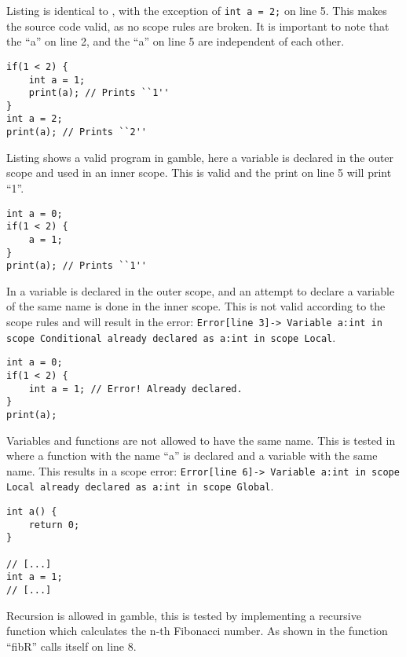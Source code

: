 Listing  is identical to , with the exception of \texttt{int a = 2;} on line 5.
This makes the source code valid, as no scope rules are broken.
It is important to note that the ``a'' on line 2, and the ``a'' on line 5 are independent of each other.

\begin{lstlisting}[caption={Example of a valid program in \gls{gamble}},label={lst:scope2},frame=tb]
if(1 < 2) {
    int a = 1;
    print(a); // Prints ``1''
}
int a = 2;
print(a); // Prints ``2''
\end{lstlisting}

Listing  shows a valid program in \gls{gamble}, here a variable is declared in the outer scope and used in an inner scope.
This is valid and the print on line 5 will print ``1''.

\begin{lstlisting}[caption={Example of a valid program in \gls{gamble}},label={lst:scope3},frame=tb]
int a = 0;
if(1 < 2) {
    a = 1;
}
print(a); // Prints ``1''
\end{lstlisting}

In  a variable is declared in the outer scope, and an attempt to declare a variable of the same name is done in the inner scope.
This is not valid according to the scope rules and will result in the error: \texttt{Error[line    3]-> Variable a:int in scope Conditional already declared as a:int in scope Local}.

\begin{lstlisting}[caption={Example of a redeclaration error in \gls{gamble}},label={lst:scope4},frame=tb]
int a = 0;
if(1 < 2) {
    int a = 1; // Error! Already declared.
}
print(a);
\end{lstlisting}

Variables and functions are not allowed to have the same name.
This is tested in  where a function with the name ``a'' is declared and a variable with the same name.
This results in a scope error: \texttt{Error[line    6]-> Variable a:int in scope Local already declared as a:int in scope Global}.

\begin{lstlisting}[caption={Example of a redeclaration error in \gls{gamble}},label={lst:scope5},frame=tb]
int a() {
    return 0;
}

// [...]
int a = 1;
// [...] 
\end{lstlisting}

Recursion is allowed in \gls{gamble}, this is tested by implementing a recursive function which calculates the n-th Fibonacci number.
As shown in  the function ``fibR'' calls itself on line 8.

